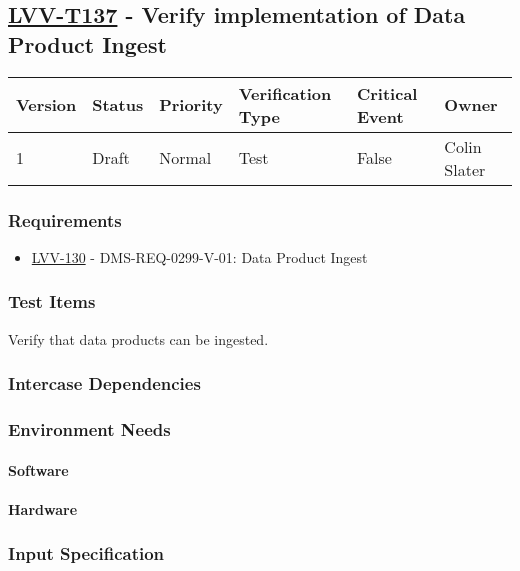 \subsection{\href{https://jira.lsstcorp.org/secure/Tests.jspa\#/testCase/LVV-T137}{LVV-T137}
    - Verify implementation of Data Product Ingest}\label{lvv-t137}

\begin{longtable}[]{llllll}
\toprule
Version & Status & Priority & Verification Type & Critical Event & Owner
\\\midrule
1 & Draft & Normal &
Test & False & Colin Slater
\\\bottomrule
\end{longtable}

\subsubsection{Requirements}
\begin{itemize}
\item \href{https://jira.lsstcorp.org/browse/LVV-130}{LVV-130} - DMS-REQ-0299-V-01: Data Product Ingest
\end{itemize}

\subsubsection{Test Items}
Verify that data products can be ingested.



\subsubsection{Intercase Dependencies}

\subsubsection{Environment Needs}

\paragraph{Software}

\paragraph{Hardware}

\subsubsection{Input Specification}

